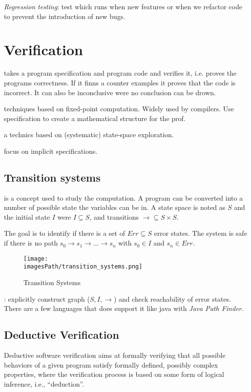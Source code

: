 \textit{Regression testing}: test which runs when new features or when we refactor code to prevent 
the introduction of new bugs.


\section{Verification}
 takes a program specification and program code
and verifies it, i.e. proves the programs correctness.
If it finns a counter examples it proves that the code is incorrect.
It can also be inconclusive were no conclusion can be drown.

 techniques based on fixed-point computation.
Widely used by compilers. Use specification to create a mathematical structure for the prof.

 a technics based on (systematic) state-space exploration.

 focus on implicit specifications.


\subsection{Transition systems}
 is a concept used to study the computation.
A program can be converted into a number of possible state the variables can be 
in. A state space is noted as $S$ and the initial state $I$ were $I\subseteq S$, 
and transitions $\rightarrow \subseteq S \times S$.

The goal is to identify if there is a set of $Err \subseteq S$ error states.
The system is safe if there is no path $s_0 \rightarrow s_1 \rightarrow \ldots \rightarrow s_n$
with $s_0\in I$ and $s_n\in Err$.

\begin{figure}[H]
    \centering
    \texttt{[image: \\imagesPath/transition\_systems.png]}
    \caption{Transition Systems}
\end{figure}

: explicitly construct graph ($S, I, \rightarrow$) and check 
reachability of error states. There are a few languages that does support it like java with 
\textit{Java Path Finder}.


\subsection{Deductive Verification}
Deductive software verification aims at formally verifying that all possible behaviors of a given program satisfy formally defined, possibly complex properties, where the verification process is based on some form of logical inference, i.e., “deduction”.

